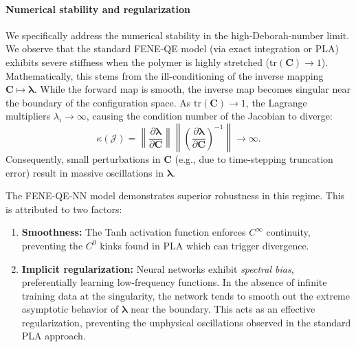 \documentclass[preprint,12pt]{elsarticle}
\begin{document}
\paragraph{Numerical stability and regularization}
We specifically address the numerical stability in the high-Deborah-number limit. We observe that the standard FENE-QE model (via exact integration or PLA) exhibits severe stiffness when the polymer is highly stretched ($\text{tr}(\bm{C}) \to 1$).
Mathematically, this stems from the ill-conditioning of the inverse mapping $\bm{C} \mapsto \bm{\lambda}$. While the forward map is smooth, the inverse map becomes singular near the boundary of the configuration space. As $\text{tr}(\bm{C}) \to 1$, the Lagrange multipliers $\lambda_i \to \infty$, causing the condition number of the Jacobian to diverge:
\begin{equation}
    \kappa(\mathcal{J}) = \left\| \frac{\partial \bm{\lambda}}{\partial \bm{C}} \right\| \left\| \left(\frac{\partial \bm{\lambda}}{\partial \bm{C}}\right)^{-1} \right\| \to \infty.
\end{equation}
Consequently, small perturbations in $\bm{C}$ (e.g., due to time-stepping truncation error) result in massive oscillations in $\bm{\lambda}$.

The FENE-QE-NN model demonstrates superior robustness in this regime. This is attributed to two factors:
\begin{enumerate}
    \item \textbf{Smoothness:} The Tanh activation function enforces $C^{\infty}$ continuity, preventing the $C^0$ kinks found in PLA which can trigger divergence.
    \item \textbf{Implicit regularization:} Neural networks exhibit \textit{spectral bias}, preferentially learning low-frequency functions. In the absence of infinite training data at the singularity, the network tends to smooth out the extreme asymptotic behavior of $\bm{\lambda}$ near the boundary. This acts as an effective regularization, preventing the unphysical oscillations observed in the standard PLA approach.
\end{enumerate}
\end{document}
